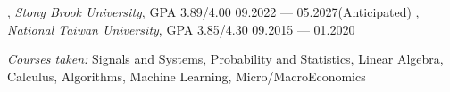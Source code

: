 


, \textit{Stony Brook University}, GPA 3.89/4.00	\hfill 09.2022 --- 05.2027(Anticipated)
, \textit{National Taiwan University}, GPA 3.85/4.30 \hfill	09.2015 --- 01.2020

\textit{Courses taken:} Signals and Systems, Probability and Statistics, Linear Algebra, Calculus, Algorithms, Machine Learning, Micro/MacroEconomics
